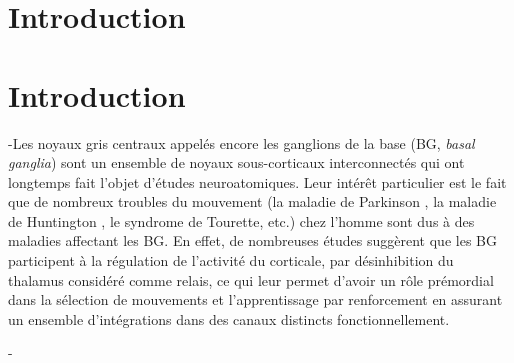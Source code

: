 \DontNumberThisInToc
\DontFrameThisInToc
{}
\section{Introduction}
 \section{Introduction}
 
-Les noyaux gris centraux appelés encore les ganglions de la base (BG, \textit{basal ganglia}) sont un ensemble de noyaux sous-corticaux interconnectés qui ont longtemps fait l'objet d'études neuroatomiques. Leur intérêt particulier est le fait que de nombreux troubles du mouvement (la maladie de Parkinson \citep{Ehringer:1960}, la maladie de Huntington \citep{Reiner:1988, Sapp:1995}, le syndrome de Tourette, etc.) chez l'homme sont dus à des maladies affectant les BG. En effet, de nombreuses études suggèrent que les BG participent à la régulation de l'activité du corticale, par désinhibition du thalamus considéré comme relais, ce qui leur permet d'avoir un rôle prémordial dans la sélection de mouvements et l'apprentissage par renforcement en assurant un ensemble d'intégrations dans des canaux distincts fonctionnellement. 
 
-%
 

